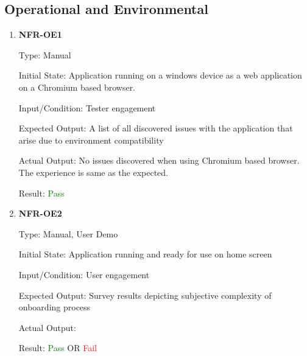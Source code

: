 \documentclass[12pt, titlepage]{article}
\begin{document}
\subsection{Operational and Environmental}
\begin{enumerate}
\item{\textbf{NFR-OE1}} \label{NFR:OE1}

Type: Manual

Initial State: Application running on a windows device as a web application on a
Chromium based browser.

Input/Condition: Tester engagement

Expected Output: A list of all discovered issues with the application that arise
due to environment compatibility

Actual Output: No issues discovered when using Chromium based browser. The experience is same as
the expected.

Result: \textcolor{green}{Pass} 
            
\item\textbf{{NFR-OE2}} \label{NFR:OE2}

Type: Manual, User Demo

Initial State: Application running and ready for use on home screen

Input/Condition: User engagement

Expected Output: Survey results depicting subjective complexity of onboarding
process

Actual Output:

Result: \textcolor{green}{Pass} OR \textcolor{red}{Fail}
\end{enumerate}
\end{document}
